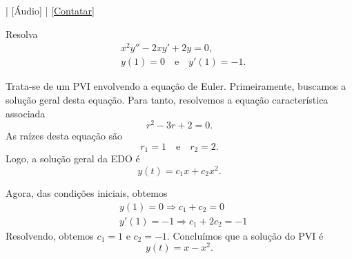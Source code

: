 \begin{flushright}
  [Vídeo] | [Áudio] | \href{https://phkonzen.github.io/notas/contato.html}{[Contatar]}
\end{flushright}

\begin{exeresol}
  Resolva
  \begin{align}
    & x^2y'' - 2xy' + 2y = 0, \\
    & y(1) = 0\quad\text{e}\quad y'(1) = -1.
  \end{align}
\end{exeresol}
\begin{resol}
  Trata-se de um PVI envolvendo a equação de Euler. Primeiramente, buscamos a solução geral desta equação. Para tanto, resolvemos a equação característica associada
  \begin{equation}
    r^2 - 3r + 2 = 0.
  \end{equation}
  As raízes desta equação são
  \begin{equation}
    r_1 = 1\quad\text{e}\quad r_2 = 2.
  \end{equation}
  Logo, a solução geral da EDO é
  \begin{equation}
    y(t) = c_1x + c_2x^2.
  \end{equation}

  Agora, das condições iniciais, obtemos
  \begin{align}
    & y(1) = 0 \Rightarrow c_1 + c_2 = 0 \\
    & y'(1) = -1 \Rightarrow c_1 + 2c_2 = -1
  \end{align}
  Resolvendo, obtemos $c_1=1$ e $c_2=-1$. Concluímos que a solução do PVI é
  \begin{equation}
    y(t) = x - x^2.
  \end{equation}
\end{resol}

